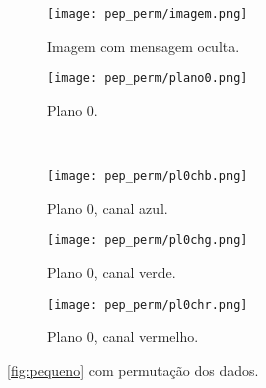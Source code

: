 \begin{figure}[H]
    \centering
    \begin{subfigure}{0.4\textwidth}
        \centering
        \texttt{[image: pep\_perm/imagem.png]}
        \caption{Imagem com mensagem oculta.}
        \label{fig:permtexto:imagem}
    \end{subfigure}%
    \begin{subfigure}{0.4\textwidth}
        \centering
        \texttt{[image: pep\_perm/plano0.png]}
        \caption{Plano 0.}
        \label{fig:permtexto:plano}
    \end{subfigure}\\[8pt]
    \begin{subfigure}{0.28\textwidth}
        \centering
        \texttt{[image: pep\_perm/pl0chb.png]}
        \caption{Plano 0, canal azul.}
        \label{fig:permtexto:blue}
    \end{subfigure}%
    \begin{subfigure}{0.28\textwidth}
        \centering
        \texttt{[image: pep\_perm/pl0chg.png]}
        \caption{Plano 0, canal verde.}
        \label{fig:permtexto:green}
    \end{subfigure}%
    \begin{subfigure}{0.28\textwidth}
        \centering
        \texttt{[image: pep\_perm/pl0chr.png]}
        \caption{Plano 0, canal vermelho.}
        \label{fig:permtexto:red}
    \end{subfigure}%

    \caption{\cref{fig:pequeno} com permutação dos dados.}
    \label{fig:permtexto}
\end{figure}